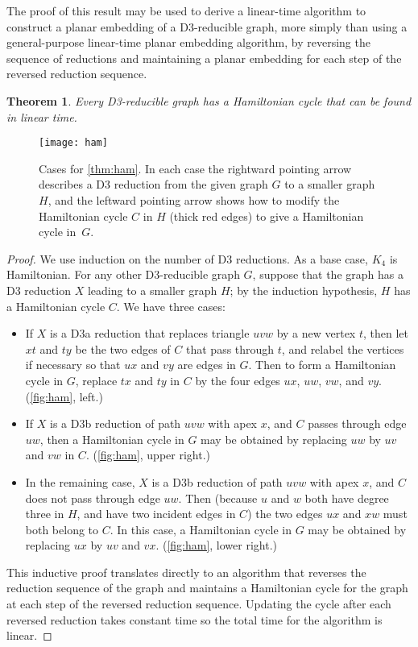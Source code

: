\documentclass{article}
\newtheorem{theorem}{Theorem}
\begin{document}
The proof of this result may be used to derive a linear-time algorithm to construct a planar embedding of a D3-reducible graph, more simply than using a general-purpose linear-time planar embedding algorithm, by reversing the sequence of reductions and maintaining a planar embedding for each step of the reversed reduction sequence.

\begin{theorem}
\label{thm:ham}
Every D3-reducible graph has a Hamiltonian cycle that can be found in linear time.
\end{theorem}

\begin{figure}[t]
\centering
\texttt{[image: ham]}
\caption{Cases for \autoref{thm:ham}. In each case the rightward pointing arrow describes a D3 reduction from the given graph $G$ to a smaller graph $H$, and the leftward pointing arrow shows how to modify the Hamiltonian cycle $C$ in $H$ (thick red edges) to give a Hamiltonian cycle in~$G$.}
\label{fig:ham}
\end{figure}

\begin{proof}
We use induction on the number of D3 reductions.
As a base case, $K_4$ is Hamiltonian. For any other D3-reducible graph $G$, suppose that the graph has a D3 reduction $X$ leading to a smaller graph $H$; by the induction hypothesis, $H$ has a Hamiltonian cycle $C$. We have three cases:
\begin{itemize}
\item If $X$ is a D3a reduction that replaces triangle $uvw$ by a new vertex $t$, then let $xt$ and $ty$ be the two edges of $C$ that pass through $t$, and relabel the vertices if necessary so that $ux$ and $vy$ are edges in $G$. Then to form a Hamiltonian cycle in $G$, replace $tx$ and $ty$ in $C$ by the four edges $ux$, $uw$, $vw$, and $vy$. (\autoref{fig:ham}, left.)
\item If $X$ is a D3b reduction of path $uvw$ with apex $x$, and $C$ passes through edge $uw$,
then a Hamiltonian cycle in $G$ may be obtained by replacing $uw$ by $uv$ and $vw$ in $C$. (\autoref{fig:ham}, upper right.)
\item In the remaining case, $X$ is a D3b reduction of path $uvw$ with apex $x$, and $C$ does not pass through edge $uw$. Then (because $u$ and $w$ both have degree three in $H$, and have two incident edges in $C$) the two edges $ux$ and $xw$ must both belong to $C$.
In this case, a Hamiltonian cycle  in $G$ may be obtained by replacing $ux$ by
$uv$ and $vx$. (\autoref{fig:ham}, lower right.)
\end{itemize}
This inductive proof translates directly to an algorithm that reverses the reduction sequence of the  graph and maintains a Hamiltonian cycle for the graph at each step of the reversed reduction sequence. Updating the cycle after each reversed reduction takes constant time so the total time for the algorithm is linear.
\end{proof}
\end{document}
